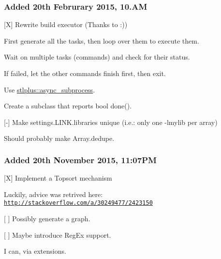 \subsubsection*{Added 20th Februrary 2015, 10.\+AM}


\begin{DoxyItemize}
\item \mbox{[}X\mbox{]} Rewrite build executor (Thanks to  \+:))
\begin{DoxyItemize}
\item First generate all the tasks, then loop over them to execute them.
\item Wait on multiple tasks (commands) and check for their status.
\begin{DoxyItemize}
\item If failed, let the other commands finish first, then exit.
\end{DoxyItemize}
\item Use {\ttfamily \hyperlink{classstlplus_1_1async__subprocess}{stlplus\+::async\+\_\+subprocess}}.
\item Create a subclass that reports {\ttfamily bool done()}.
\end{DoxyItemize}
\item \mbox{[}-\/\mbox{]} Make {\ttfamily settings.\+L\+I\+N\+K.\+libraries} unique (i.\+e.\+: only one {\ttfamily -\/lmylib} per array)
\begin{DoxyItemize}
\item Should probably make {\ttfamily Array.\+dedupe}.
\end{DoxyItemize}
\end{DoxyItemize}

\subsubsection*{Added 20th November 2015, 11\+:07\+PM}


\begin{DoxyItemize}
\item \mbox{[}X\mbox{]} Implement a Topsort mechanism
\begin{DoxyItemize}
\item Luckily, advice was retrived here\+: \href{http://stackoverflow.com/a/30249477/2423150}{\tt http\+://stackoverflow.\+com/a/30249477/2423150}
\end{DoxyItemize}
\item \mbox{[} \mbox{]} Possibly generate a graph.
\item \mbox{[} \mbox{]} Maybe introduce Reg\+Ex support.
\begin{DoxyItemize}
\item I can, via extensions.
\end{DoxyItemize}
\end{DoxyItemize}


